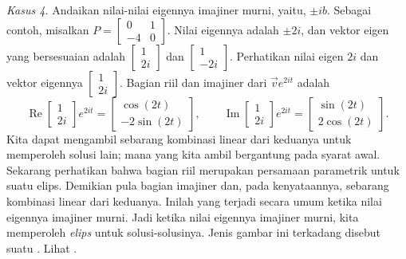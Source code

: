\medskip

\pagebreak[0]
\emph{Kasus 4.} Andaikan nilai-nilai eigennya imajiner murni, yaitu,
$\pm ib$.  Sebagai contoh,
misalkan $P = 
\left[ \begin{smallmatrix} 0 & 1 \\ -4 & 0 \end{smallmatrix} \right]$.
Nilai eigennya adalah $\pm 2i$, dan vektor eigen yang bersesuaian adalah
$\left[ \begin{smallmatrix} 1 \\ 2i \end{smallmatrix} \right]$ dan
$\left[ \begin{smallmatrix} 1 \\ -2i \end{smallmatrix} \right]$.  Perhatikan
nilai eigen $2i$ dan vektor eigennya
$\left[ \begin{smallmatrix} 1 \\ 2i \end{smallmatrix} \right]$.
Bagian riil dan imajiner
dari $\vec{v} e^{2it}$ adalah
\begin{equation*}
\operatorname{Re}
\begin{bmatrix} 1 \\ 2i \end{bmatrix} e^{2it} =
\begin{bmatrix} \cos (2t) \\ -2 \sin (2t)  \end{bmatrix} ,
\qquad
\operatorname{Im}
\begin{bmatrix} 1 \\ 2i \end{bmatrix} e^{2it} =
\begin{bmatrix} \sin (2t) \\ 2 \cos (2t) \end{bmatrix} .
\end{equation*}
Kita dapat mengambil sebarang kombinasi linear dari keduanya untuk memperoleh solusi lain;
mana yang kita ambil
bergantung pada syarat
awal.  Sekarang perhatikan bahwa bagian riil merupakan
persamaan parametrik untuk suatu elips.  Demikian pula bagian imajiner
dan, pada kenyataannya, sebarang kombinasi linear dari keduanya.
Inilah yang terjadi secara umum ketika nilai eigennya imajiner murni.
Jadi ketika nilai eigennya imajiner murni, kita memperoleh
\emph{elips} untuk
solusi-solusinya.  Jenis gambar ini terkadang disebut suatu
\emph{}.  Lihat .


